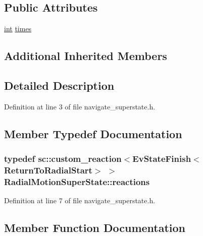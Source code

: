 \subsection*{Public Attributes}
\begin{DoxyCompactItemize}
\item 
\hyperlink{classint}{int} \hyperlink{structRadialMotionSuperState_a5c3f8ae40956fbf369e803efdd52629d}{times}
\end{DoxyCompactItemize}
\subsection*{Additional Inherited Members}


\subsection{Detailed Description}


Definition at line 3 of file navigate\+\_\+superstate.\+h.



\subsection{Member Typedef Documentation}
\subsubsection[{\texorpdfstring{reactions}{reactions}}]{\setlength{\rightskip}{0pt plus 5cm}typedef sc\+::custom\+\_\+reaction$<${\bf Ev\+State\+Finish}$<${\bf Return\+To\+Radial\+Start}$>$ $>$ {\bf Radial\+Motion\+Super\+State\+::reactions}}\hypertarget{structRadialMotionSuperState_a6794c75ce7726b0ceae0d49fe61668be}{}\label{structRadialMotionSuperState_a6794c75ce7726b0ceae0d49fe61668be}


Definition at line 7 of file navigate\+\_\+superstate.\+h.



\subsection{Member Function Documentation}
